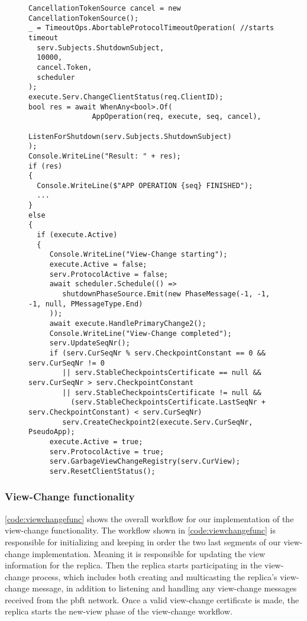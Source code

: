 \begin{figure}[H]
	\centering
	\begin{lstlisting}[label = code:timeout, caption=Handling timeout for the normal protocol workflow and initiate the View-Change process, captionpos = b, basicstyle=\scriptsize]
CancellationTokenSource cancel = new CancellationTokenSource();
_ = TimeoutOps.AbortableProtocolTimeoutOperation( //starts timeout
  serv.Subjects.ShutdownSubject,
  10000,
  cancel.Token,
  scheduler
);
execute.Serv.ChangeClientStatus(req.ClientID);
bool res = await WhenAny<bool>.Of(
               AppOperation(req, execute, seq, cancel),
               ListenForShutdown(serv.Subjects.ShutdownSubject)
);
Console.WriteLine("Result: " + res);
if (res)
{
  Console.WriteLine($"APP OPERATION {seq} FINISHED");
  ...
}
else
{
  if (execute.Active)
  {
     Console.WriteLine("View-Change starting");
     execute.Active = false;
     serv.ProtocolActive = false;
     await scheduler.Schedule(() =>
        shutdownPhaseSource.Emit(new PhaseMessage(-1, -1, -1, null, PMessageType.End)
     ));
     await execute.HandlePrimaryChange2();
     Console.WriteLine("View-Change completed");
     serv.UpdateSeqNr();
     if (serv.CurSeqNr % serv.CheckpointConstant == 0 && serv.CurSeqNr != 0
        || serv.StableCheckpointsCertificate == null && serv.CurSeqNr > serv.CheckpointConstant
        || serv.StableCheckpointsCertificate != null &&
          (serv.StableCheckpointsCertificate.LastSeqNr + serv.CheckpointConstant) < serv.CurSeqNr)
        serv.CreateCheckpoint2(execute.Serv.CurSeqNr, PseudoApp);
     execute.Active = true;
     serv.ProtocolActive = true;
     serv.GarbageViewChangeRegistry(serv.CurView);
     serv.ResetClientStatus();
   \end{lstlisting}
\end{figure}


\subsubsection{View-Change functionality}

\autoref{code:viewchangefunc} shows the overall workflow for our implementation of the view-change functionality.  The workflow shown in \autoref{code:viewchangefunc} is responsible for initializing and keeping in order the two last segments of our view-change implementation.  Meaning it is responsible for updating the view information for the replica. Then the replica starts participating in the view-change process, which includes both creating and multicasting the replica's view-change message, in addition to listening and handling any view-change messages received from the \ac{pbft} network. Once a valid view-change certificate is made, the replica starts the new-view phase of the view-change workflow. 

